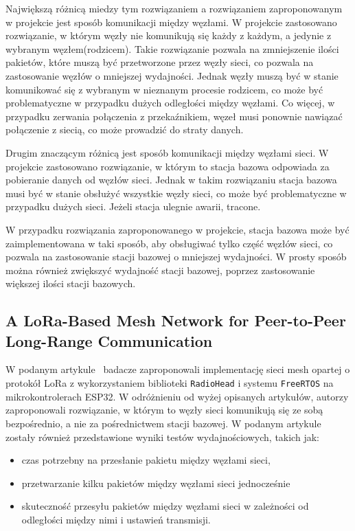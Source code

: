 Największą różnicą miedzy tym rozwiązaniem a rozwiązaniem zaproponowanym w projekcie jest sposób komunikacji między węzłami. W projekcie zastosowano rozwiązanie, w którym węzły nie komunikują się każdy z każdym, a jedynie z wybranym węzłem(rodzicem). Takie rozwiązanie pozwala na zmniejszenie ilości pakietów, które muszą być przetworzone przez węzły sieci, co pozwala na zastosowanie węzłów o mniejszej wydajności. Jednak węzły muszą być w stanie komunikować się z wybranym w nieznanym procesie rodzicem, co może być problematyczne w przypadku dużych odległości między węzłami. Co więcej, w przypadku zerwania połączenia z przekaźnikiem, węzeł musi ponownie nawiązać połączenie z siecią, co może prowadzić do straty danych.

Drugim znaczącym różnicą jest sposób komunikacji między węzłami sieci. W projekcie zastosowano rozwiązanie, w którym to stacja bazowa odpowiada za pobieranie danych od węzłów sieci. Jednak w takim rozwiązaniu stacja bazowa musi być w stanie obsłużyć wszystkie węzły sieci, co może być problematyczne w przypadku dużych sieci. Jeżeli stacja ulegnie awarii, tracone.

W przypadku rozwiązania zaproponowanego w projekcie, stacja bazowa może być zaimplementowana w taki sposób, aby obsługiwać tylko część węzłów sieci, co pozwala na zastosowanie stacji bazowej o mniejszej wydajności. W prosty sposób można również zwiększyć wydajność stacji bazowej, poprzez zastosowanie większej ilości stacji bazowych.

\subsection{A LoRa-Based Mesh Network for Peer-to-Peer Long-Range Communication}
W podanym artykule~\cite{s21134314} badacze zaproponowali implementację sieci mesh opartej o protokół LoRa z wykorzystaniem biblioteki \texttt{RadioHead} i systemu \texttt{FreeRTOS} na mikrokontrolerach ESP32. W odróżnieniu od wyżej opisanych artykułów, autorzy zaproponowali rozwiązanie, w którym to węzły sieci komunikują się ze sobą bezpośrednio, a nie za pośrednictwem stacji bazowej. W podanym artykule zostały również przedstawione wyniki testów wydajnościowych, takich jak:
\begin{itemize}
    \item czas potrzebny na przesłanie pakietu między węzłami sieci,
    \item przetwarzanie kilku pakietów między węzłami sieci jednocześnie
    \item skuteczność przesyłu pakietów między węzłami sieci w zależności od odległości między nimi i ustawień transmisji.
\end{itemize}

